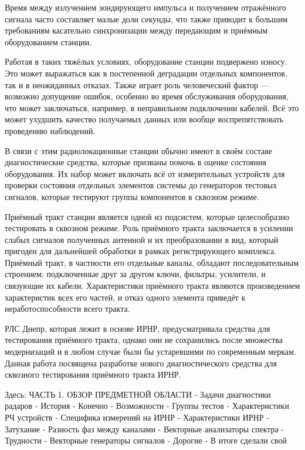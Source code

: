 \documentclass{report}
\begin{document}
Время между излучением зондирующего импульса и получением отражённого сигнала часто составляет малые доли секунды, что также приводит к большим требованиям касательно синхронизации между передающим и приёмным оборудованием станции.

Работая в таких тяжёлых условиях, оборудование станции подвержено износу. Это может выражаться как в постепенной деградации отдельных компонентов, так и в неожиданных отказах. Также играет роль человеческий фактор --- возможно допущение ошибок, особенно во время обслуживания оборудования, что может заключаться, например, в неправильном подключении кабелей. Всё это может ухудшить качество получаемых данных или вообще воспрепятствовать проведению наблюдений.

В связи с этим радиолокационные станции обычно имеют в своём составе диагностические средства, которые призваны помочь в оценке состояния оборудования. Их набор может включать всё от измерительных устройств для проверки состояния отдельных элементов системы до генераторов тестовых сигналов, которые тестируют группы компонентов в сквозном режиме.

Приёмный тракт станции является одной из подсистем, которые целесообразно тестировать в сквозном режиме. Роль приёмного тракта заключается в усилении слабых сигналов полученных антенной и их преобразовании в вид, который пригоден для дальнейшей обработки в рамках регистрирующего комплекса. Приёмный тракт, в частности его отдельные каналы, обладают последовательным строением: подключенные друг за другом ключи, фильтры, усилители, и связующие их кабели. Характеристики приёмного тракта являются произведением характеристик всех его частей, и отказ одного элемента приведёт к неработоспособности всего тракта.

РЛС Днепр, которая лежит в основе ИРНР, предусматривала средства для тестирования приёмного тракта, однако они не сохранились после множества модернизаций и в любом случае были бы устаревшими по современным меркам. Данная работа посвящена разработке нового диагностического средства для сквозного тестирования приёмного тракта ИРНР.

Здесь:
ЧАСТЬ 1. ОБЗОР ПРЕДМЕТНОЙ ОБЛАСТИ
- Задачи диагностики радаров
    - История
        - Конечно
    - Возможности
        - Группы тестов
- Характеристики РЧ устройств
- Специфика измерений на ИРНР
    - Характеристики ИРНР
    - Затухание
    - Разность фаз между каналами
- Векторные анализаторы спектра
    - Трудности
- Векторные генераторы сигналов
    - Дорогие
    - В итоге сделали свой
\end{document}
